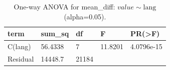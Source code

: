 \begin{table}
\caption{One-way ANOVA for mean_diff: $value \sim \mathrm{lang}$ (alpha=0.05).}
\label{tab:anova_1way_lang_mean_diff_2022}
\begin{tabular}{lllll}
\toprule
term & sum_sq & df & F & PR(>F) \\
\midrule
C(lang) & 56.4338 & 7 & 11.8201 & 4.0796e-15 \\
Residual & 14448.7 & 21184 &  &  \\
\bottomrule
\end{tabular}
\end{table}

